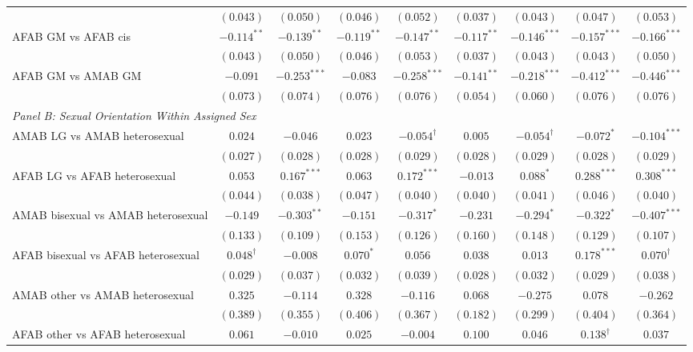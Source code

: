\begin{table}[htpb]
{\begin{tabular}{l c c c c c c c c}
 & $(0.043)$ & $(0.050)$ & $(0.046)$ & $(0.052)$ & $(0.037)$ & $(0.043)$ & $(0.047)$ & $(0.053)$ \\
AFAB GM vs AFAB cis & $-0.114^{**}$ & $-0.139^{**}$ & $-0.119^{**}$ & $-0.147^{**}$ & $-0.117^{**}$ & $-0.146^{***}$ & $-0.157^{***}$ & $-0.166^{***}$ \\
 & $(0.043)$ & $(0.050)$ & $(0.046)$ & $(0.053)$ & $(0.037)$ & $(0.043)$ & $(0.043)$ & $(0.050)$ \\
AFAB GM vs AMAB GM & $-0.091$ & $-0.253^{***}$ & $-0.083$ & $-0.258^{***}$ & $-0.141^{**}$ & $-0.218^{***}$ & $-0.412^{***}$ & $-0.446^{***}$ \\
 & $(0.073)$ & $(0.074)$ & $(0.076)$ & $(0.076)$ & $(0.054)$ & $(0.060)$ & $(0.076)$ & $(0.076)$ \\
\hline
\multicolumn{9}{l}{\textit{Panel B: Sexual Orientation Within Assigned Sex}} \\ 
AMAB LG vs AMAB heterosexual & $0.024$ & $-0.046$ & $0.023$ & $-0.054^{\dagger}$ & $0.005$ & $-0.054^{\dagger}$ & $-0.072^{*}$ & $-0.104^{***}$ \\
 & $(0.027)$ & $(0.028)$ & $(0.028)$ & $(0.029)$ & $(0.028)$ & $(0.029)$ & $(0.028)$ & $(0.029)$ \\
AFAB LG vs AFAB heterosexual & $0.053$ & $0.167^{***}$ & $0.063$ & $0.172^{***}$ & $-0.013$ & $0.088^{*}$ & $0.288^{***}$ & $0.308^{***}$ \\
 & $(0.044)$ & $(0.038)$ & $(0.047)$ & $(0.040)$ & $(0.040)$ & $(0.041)$ & $(0.046)$ & $(0.040)$ \\
AMAB bisexual vs AMAB heterosexual & $-0.149$ & $-0.303^{**}$ & $-0.151$ & $-0.317^{*}$ & $-0.231$ & $-0.294^{*}$ & $-0.322^{*}$ & $-0.407^{***}$ \\
 & $(0.133)$ & $(0.109)$ & $(0.153)$ & $(0.126)$ & $(0.160)$ & $(0.148)$ & $(0.129)$ & $(0.107)$ \\
AFAB bisexual vs AFAB heterosexual & $0.048^{\dagger}$ & $-0.008$ & $0.070^{*}$ & $0.056$ & $0.038$ & $0.013$ & $0.178^{***}$ & $0.070^{\dagger}$ \\
 & $(0.029)$ & $(0.037)$ & $(0.032)$ & $(0.039)$ & $(0.028)$ & $(0.032)$ & $(0.029)$ & $(0.038)$ \\
AMAB other vs AMAB heterosexual & $0.325$ & $-0.114$ & $0.328$ & $-0.116$ & $0.068$ & $-0.275$ & $0.078$ & $-0.262$ \\
 & $(0.389)$ & $(0.355)$ & $(0.406)$ & $(0.367)$ & $(0.182)$ & $(0.299)$ & $(0.404)$ & $(0.364)$ \\
AFAB other vs AFAB heterosexual & $0.061$ & $-0.010$ & $0.025$ & $-0.004$ & $0.100$ & $0.046$ & $0.138^{\dagger}$ & $0.037$ \\

\end{tabular}}
\end{table}
